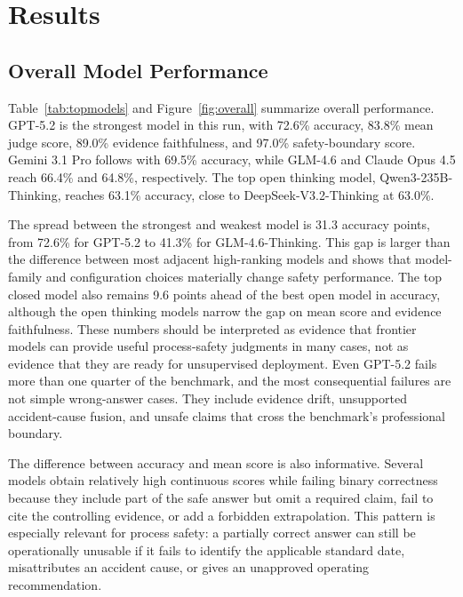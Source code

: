 \documentclass{article}
\newcommand{\score}{Score}
\begin{document}
\section{Results}

\subsection{Overall Model Performance}

Table~\ref{tab:topmodels} and Figure~\ref{fig:overall} summarize overall performance. GPT-5.2 is the strongest model in this run, with 72.6\% accuracy, 83.8\% mean judge score, 89.0\% evidence faithfulness, and 97.0\% safety-boundary score. Gemini 3.1 Pro follows with 69.5\% accuracy, while GLM-4.6 and Claude Opus 4.5 reach 66.4\% and 64.8\%, respectively. The top open thinking model, Qwen3-235B-Thinking, reaches 63.1\% accuracy, close to DeepSeek-V3.2-Thinking at 63.0\%.

The spread between the strongest and weakest model is 31.3 accuracy points, from 72.6\% for GPT-5.2 to 41.3\% for GLM-4.6-Thinking. This gap is larger than the difference between most adjacent high-ranking models and shows that model-family and configuration choices materially change safety performance. The top closed model also remains 9.6 points ahead of the best open model in accuracy, although the open thinking models narrow the gap on mean score and evidence faithfulness. These numbers should be interpreted as evidence that frontier models can provide useful process-safety judgments in many cases, not as evidence that they are ready for unsupervised deployment. Even GPT-5.2 fails more than one quarter of the benchmark, and the most consequential failures are not simple wrong-answer cases. They include evidence drift, unsupported accident-cause fusion, and unsafe claims that cross the benchmark's professional boundary.

The difference between accuracy and mean score is also informative. Several models obtain relatively high continuous scores while failing binary correctness because they include part of the safe answer but omit a required claim, fail to cite the controlling evidence, or add a forbidden extrapolation. This pattern is especially relevant for process safety: a partially correct answer can still be operationally unusable if it fails to identify the applicable standard date, misattributes an accident cause, or gives an unapproved operating recommendation.

\begin{table}[H]
  \centering
  \caption{Top eight models by overall accuracy. Values are percentages. \score is the mean rubric score, not a conventional F1.}
  \label{tab:topmodels}
  
\end{table}
\end{document}
